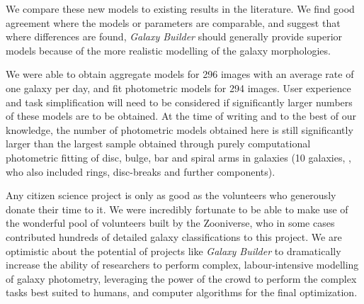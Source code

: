 \documentclass[main\.tex]{subfiles}
\begin{document}
We compare these new models to existing results in the literature. We find good agreement where the models or parameters are comparable, and suggest that where differences are found, \textit{Galaxy Builder} should generally provide superior models because of the more realistic modelling of the galaxy morphologies.

We were able to obtain aggregate models for 296 images with an average rate of one galaxy per day, and fit photometric models for 294 images. User experience and task simplification will need to be considered if significantly larger numbers of these models are to be obtained. At the time of writing and to the best of our knowledge, the number of photometric models obtained here is still significantly larger than the largest sample obtained through purely computational photometric fitting of disc, bulge, bar and spiral arms in galaxies (10 galaxies, \citealt{Gao2017:1709.00746v1}, who also included rings, disc-breaks and further components).

Any citizen science project is only as good as the volunteers who generously donate their time to it. We were incredibly fortunate to be able to make use of the wonderful pool of volunteers built by the Zooniverse, who in some cases contributed hundreds of detailed galaxy classifications to this project. We are optimistic about the potential of projects like \textit{Galaxy Builder} to dramatically increase the ability of researchers to perform complex, labour-intensive modelling of galaxy photometry, leveraging the power of the crowd to perform the complex tasks best suited to humans, and computer algorithms for the final optimization.
\end{document}
